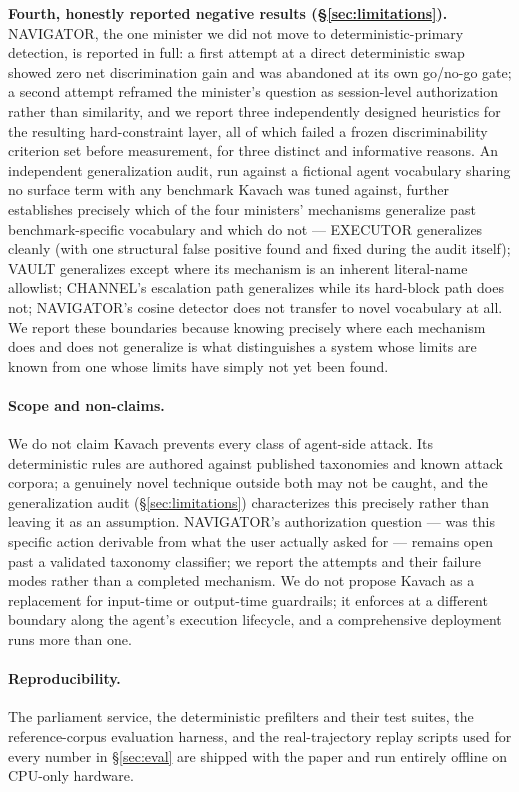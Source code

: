 \documentclass[sigconf,anonymous,review]{acmart}
\begin{document}
\textbf{Fourth, honestly reported negative results
(\S\ref{sec:limitations}).} NAVIGATOR, the one minister we did not move to
deterministic-primary detection, is reported in full: a first attempt at a
direct deterministic swap showed zero net discrimination gain and was
abandoned at its own go/no-go gate; a second attempt reframed the minister's
question as session-level authorization rather than similarity, and we
report three independently designed heuristics for the resulting
hard-constraint layer, all of which failed a frozen discriminability
criterion set before measurement, for three distinct and informative
reasons. An independent generalization audit, run against a fictional agent
vocabulary sharing no surface term with any benchmark Kavach was tuned
against, further establishes precisely which of the four ministers'
mechanisms generalize past benchmark-specific vocabulary and which do not
--- EXECUTOR generalizes cleanly (with one structural false positive found
and fixed during the audit itself); VAULT generalizes except where its
mechanism is an inherent literal-name allowlist; CHANNEL's escalation path
generalizes while its hard-block path does not; NAVIGATOR's cosine detector
does not transfer to novel vocabulary at all. We report these boundaries
because knowing precisely where each mechanism does and does not generalize
is what distinguishes a system whose limits are known from one whose limits
have simply not yet been found.

\paragraph{Scope and non-claims.} We do not claim Kavach prevents every
class of agent-side attack. Its deterministic rules are authored against
published taxonomies and known attack corpora; a genuinely novel technique
outside both may not be caught, and the generalization audit
(\S\ref{sec:limitations}) characterizes this precisely rather than leaving
it as an assumption. NAVIGATOR's authorization question --- was this
specific action derivable from what the user actually asked for --- remains
open past a validated taxonomy classifier; we report the attempts and their
failure modes rather than a completed mechanism. We do not propose Kavach as
a replacement for input-time or output-time guardrails; it enforces at a
different boundary along the agent's execution lifecycle, and a
comprehensive deployment runs more than one.

\paragraph{Reproducibility.} The parliament service, the deterministic
prefilters and their test suites, the reference-corpus evaluation harness,
and the real-trajectory replay scripts used for every number in
\S\ref{sec:eval} are shipped with the paper and run entirely offline on
CPU-only hardware.
\end{document}
